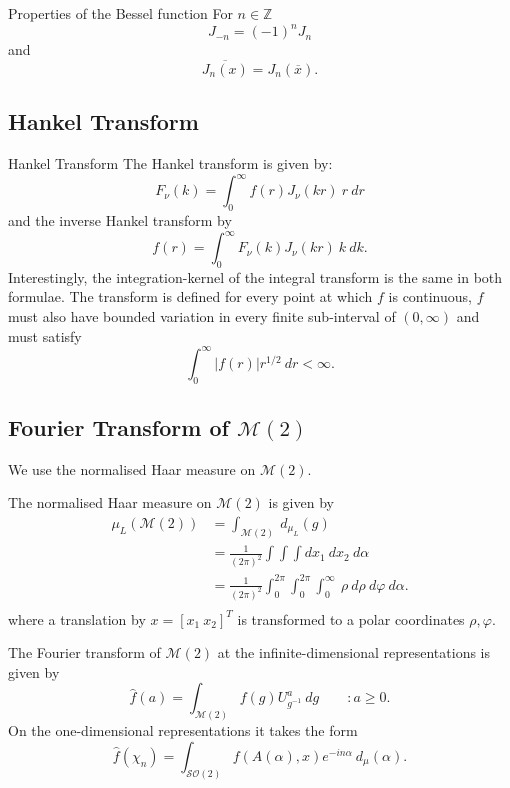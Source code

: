\documentclass{article}
\begin{document}
\begin{Theorem}{Properties of the Bessel function} For $n \in \mathbb{Z}$
    \[%
        J_{-n} = (-1)^{n}J_{n} 
    \]%
    and
    \[%
        \overline{J_{n}(x)} = J_{n}(\overline{x}).
    \]%
    \QED
\end{Theorem}

\subsection{Hankel Transform} 
\begin{Define}{Hankel Transform}
    The Hankel transform is given by:
    \[
        F_{\nu}(k) = \int^{\infty}_{0} f(r) J_{\nu}(kr) \ r \ dr
    \]
    and the inverse Hankel transform by
    \[
        f(r) = \int^{\infty}_{0} F_{\nu}(k)J_{\nu}(kr) \ k \ dk.
    \]
    Interestingly, the integration-kernel of the integral transform is the same in both formulae. The transform is defined for every point at which $f$  is continuous, $f$  must also have bounded variation in every finite sub-interval of  $(0, \infty)$  and must satisfy
    \[
        \int^{\infty}_{0} | f(r) | r^{1/2} \ dr < \infty.
    \]
\end{Define}

\subsection{Fourier Transform of $\mathcal{M}(2)$} 

We use the normalised Haar measure on $\mathcal{M}(2)$. 
\begin{define}
    The normalised Haar measure on $\mathcal{M}(2)$ is given by
    \[%
        \begin{split}
        \mu_{L}(\mathcal{M}(2)) 
        &= \int_{\mathcal{M}(2)} \ d_{\mu_{L}} (g) \\
        &= \frac{1}{(2\pi)^{2}} \int\int\int dx_1 \ dx_2 \ d\alpha \\
        &= \frac{1}{(2\pi)^{2}} \int^{2\pi}_{0}\int^{2\pi}_{0}\int^{\infty}_{0} \ \rho \ d\rho \ d\varphi \ d\alpha .\\
        \end{split}
    \]%
    where a translation by $x = [x_1 \ x_2]^{T}$ is transformed to a polar coordinates $\rho ,\varphi$.
\end{define}
\begin{define}
    The Fourier transform of $\mathcal{M}(2)$ at the infinite-dimensional representations is given by
    \[%
        \hat{f}(a) = \int_{\mathcal{M}(2)} f(g) U^{a}_{g^{-1}} \ dg \qquad : a \geq 0.
    \]%
    On the one-dimensional representations it takes the form
    \[%
        \hat{f}(\chi_{n}) = \int_{\mathcal{SO}(2)} f(A(\alpha),x) e^{-in\alpha} \ d_{\mu}(\alpha) .
    \]%
\end{define}
\end{document}
